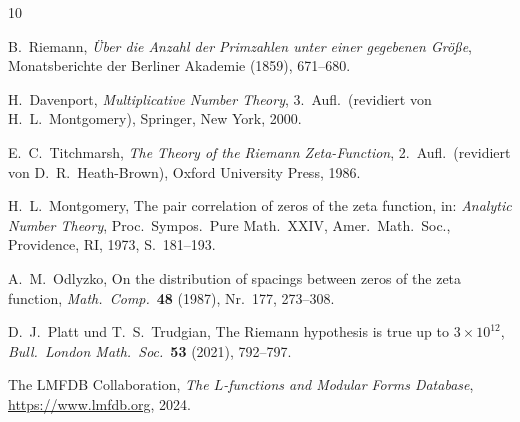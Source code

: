 \documentclass[12pt,a4paper]{amsart}
\theoremstyle{definition}
\begin{document}
\begin{thebibliography}{10}

B.~Riemann,
\emph{\"Uber die Anzahl der Primzahlen unter einer gegebenen Gr\"o\ss e},
Monatsberichte der Berliner Akademie (1859), 671--680.

H.~Davenport,
\emph{Multiplicative Number Theory}, 3.~Aufl.\
(revidiert von H.~L.~Montgomery),
Springer, New York, 2000.

E.~C.~Titchmarsh,
\emph{The Theory of the Riemann Zeta-Function}, 2.~Aufl.\
(revidiert von D.~R.~Heath-Brown),
Oxford University Press, 1986.

H.~L.~Montgomery,
The pair correlation of zeros of the zeta function,
in: \emph{Analytic Number Theory}, Proc.\ Sympos.\ Pure Math.~XXIV,
Amer.\ Math.\ Soc., Providence, RI, 1973, S.~181--193.

A.~M.~Odlyzko,
On the distribution of spacings between zeros of the zeta function,
\emph{Math.\ Comp.}\ \textbf{48} (1987), Nr.~177, 273--308.

D.~J.~Platt und T.~S.~Trudgian,
The Riemann hypothesis is true up to $3 \times 10^{12}$,
\emph{Bull.\ London Math.\ Soc.}\ \textbf{53} (2021), 792--797.

\bibitem{LMFDB}
The LMFDB Collaboration,
\emph{The $L$-functions and Modular Forms Database},
\url{https://www.lmfdb.org}, 2024.

\end{thebibliography}
\end{document}
